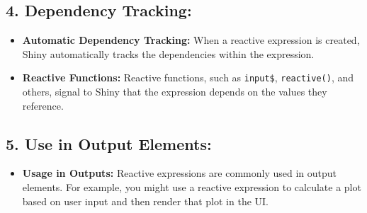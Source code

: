 \documentclass[
]{book}
\newenvironment{Shaded}{\begin{snugshade}}{\end{snugshade}}
\newcommand{\CommentTok}[1]{\textcolor[rgb]{0.56,0.35,0.01}{\textit{#1}}}
\newcommand{\FunctionTok}[1]{\textcolor[rgb]{0.13,0.29,0.53}{\textbf{#1}}}
\newcommand{\NormalTok}[1]{#1}
\newcommand{\OtherTok}[1]{\textcolor[rgb]{0.56,0.35,0.01}{#1}}
\newcommand{\SpecialCharTok}[1]{\textcolor[rgb]{0.81,0.36,0.00}{\textbf{#1}}}
\providecommand{\tightlist}{%
  \setlength{\itemsep}{0pt}\setlength{\parskip}{0pt}}
\begin{document}
\begin{Shaded}
\end{Shaded}

\hypertarget{dependency-tracking}{%
\subsection{\texorpdfstring{4. \textbf{Dependency Tracking:}}{4. Dependency Tracking:}}\label{dependency-tracking}}

\begin{itemize}
\tightlist
\item
  \textbf{Automatic Dependency Tracking:} When a reactive expression is created, Shiny automatically tracks the dependencies within the expression.
\item
  \textbf{Reactive Functions:} Reactive functions, such as \texttt{input\$}, \texttt{reactive()}, and others, signal to Shiny that the expression depends on the values they reference.
\end{itemize}

\hypertarget{use-in-output-elements}{%
\subsection{\texorpdfstring{5. \textbf{Use in Output Elements:}}{5. Use in Output Elements:}}\label{use-in-output-elements}}

\begin{itemize}
\tightlist
\item
  \textbf{Usage in Outputs:} Reactive expressions are commonly used in output elements. For example, you might use a reactive expression to calculate a plot based on user input and then render that plot in the UI.
\end{itemize}

\begin{Shaded}
\end{Shaded}
\end{document}
